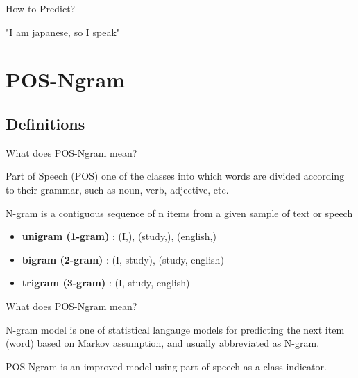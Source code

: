 \documentclass{beamer}
\begin{document}
\begin{frame}{How to \textcolor[rgb]{0.8,0.2,0}{Predict}?}
    \centering

    "I am japanese, so I speak"  
\end{frame}
\section{POS-Ngram}
\subsection{Definitions}

\begin{frame}{What does POS-Ngram mean?}
    \begin{definition}{Part of Speech (POS)}
        one of the classes into which words are divided according to their grammar,
        such as noun, verb, adjective, etc.
    \end{definition}
    \begin{definition}{N-gram}
        is a contiguous sequence of n items from a given sample of text or speech
        \begin{itemize}
            \item \textbf{unigram (1-gram)} : (I,), (study,), (english,)
            \item \textbf{bigram (2-gram)} : (I, study), (study, english) 
            \item \textbf{trigram (3-gram)} : (I, study, english)
        \end{itemize}
    \end{definition}
\end{frame}

\begin{frame}{What does POS-Ngram mean?}
    \begin{definition}{N-gram model}
        is one of statistical langauge models for predicting the next item (word) based on Markov assumption, and usually abbreviated as N-gram.
    \end{definition}
    \begin{definition}{POS-Ngram}
        is an improved model using part of speech as a class indicator.
    \end{definition}
\end{frame}
\end{document}

